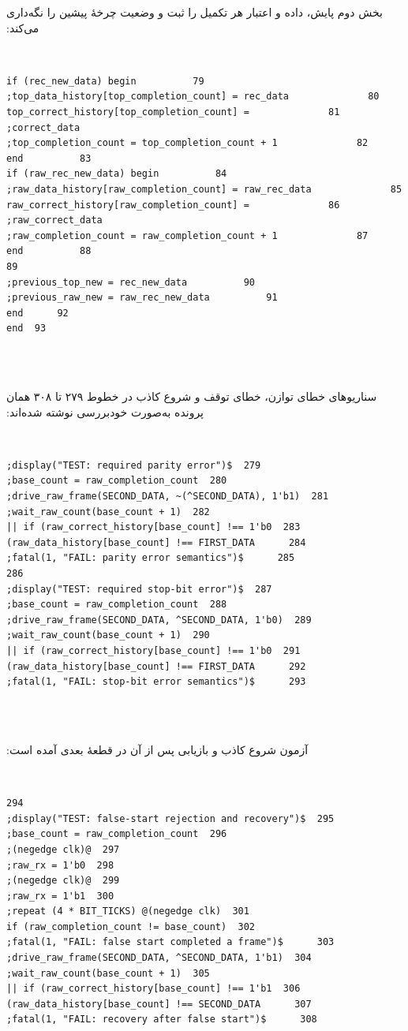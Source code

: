 ‫
‫بخش دوم پایش، داده و اعتبار هر تکمیل را ثبت و وضعیت چرخهٔ پیشین را نگه‌داری می‌کند:
‫
‫\begin{dsdlcodeblock}
‫\begin{verbatim}
‫79          if (rec_new_data) begin
‫80              top_data_history[top_completion_count] = rec_data;
‫81              top_correct_history[top_completion_count] = correct_data;
‫82              top_completion_count = top_completion_count + 1;
‫83          end
‫84          if (raw_rec_new_data) begin
‫85              raw_data_history[raw_completion_count] = raw_rec_data;
‫86              raw_correct_history[raw_completion_count] = raw_correct_data;
‫87              raw_completion_count = raw_completion_count + 1;
‫88          end
‫89
‫90          previous_top_new = rec_new_data;
‫91          previous_raw_new = raw_rec_new_data;
‫92      end
‫93  end
‫\end{verbatim}
‫\end{dsdlcodeblock}
‫
‫سناریوهای خطای توازن، خطای توقف و شروع کاذب در خطوط ۲۷۹ تا ۳۰۸ همان پرونده به‌صورت
‫خودبررسی نوشته شده‌اند:
‫
‫\begin{dsdlcodeblock}
‫\begin{verbatim}
‫279  $display("TEST: required parity error");
‫280  base_count = raw_completion_count;
‫281  drive_raw_frame(SECOND_DATA, ~(^SECOND_DATA), 1'b1);
‫282  wait_raw_count(base_count + 1);
‫283  if (raw_correct_history[base_count] !== 1'b0 ||
‫284      raw_data_history[base_count] !== FIRST_DATA)
‫285      $fatal(1, "FAIL: parity error semantics");
‫286
‫287  $display("TEST: required stop-bit error");
‫288  base_count = raw_completion_count;
‫289  drive_raw_frame(SECOND_DATA, ^SECOND_DATA, 1'b0);
‫290  wait_raw_count(base_count + 1);
‫291  if (raw_correct_history[base_count] !== 1'b0 ||
‫292      raw_data_history[base_count] !== FIRST_DATA)
‫293      $fatal(1, "FAIL: stop-bit error semantics");
‫\end{verbatim}
‫\end{dsdlcodeblock}
‫
‫آزمون شروع کاذب و بازیابی پس از آن در قطعهٔ بعدی آمده است:
‫
‫\begin{dsdlcodeblock}
‫\begin{verbatim}
‫294
‫295  $display("TEST: false-start rejection and recovery");
‫296  base_count = raw_completion_count;
‫297  @(negedge clk);
‫298  raw_rx = 1'b0;
‫299  @(negedge clk);
‫300  raw_rx = 1'b1;
‫301  repeat (4 * BIT_TICKS) @(negedge clk);
‫302  if (raw_completion_count != base_count)
‫303      $fatal(1, "FAIL: false start completed a frame");
‫304  drive_raw_frame(SECOND_DATA, ^SECOND_DATA, 1'b1);
‫305  wait_raw_count(base_count + 1);
‫306  if (raw_correct_history[base_count] !== 1'b1 ||
‫307      raw_data_history[base_count] !== SECOND_DATA)
‫308      $fatal(1, "FAIL: recovery after false start");
‫\end{verbatim}
‫\end{dsdlcodeblock}
